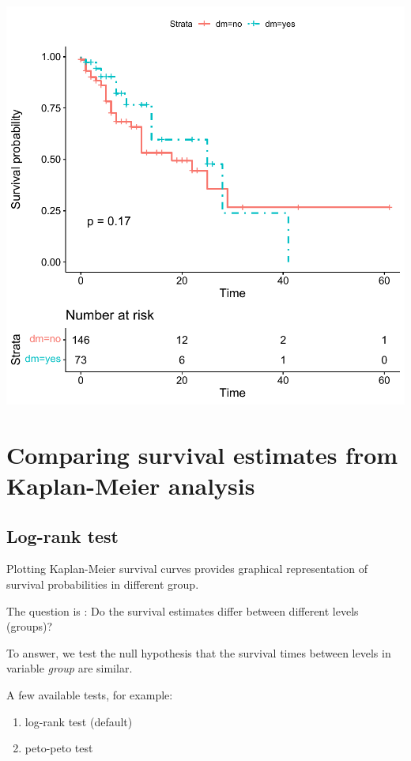 \documentclass[
]{book}
\providecommand{\tightlist}{%
  \setlength{\itemsep}{0pt}\setlength{\parskip}{0pt}}
\begin{document}
\begin{center}\includegraphics[width=0.7\linewidth,keepaspectratio]{Multivariable_Data_Analysis_files/figure-latex/unnamed-chunk-175-1} \end{center}

\hypertarget{comparing-survival-estimates-from-kaplan-meier-analysis}{%
\section{Comparing survival estimates from Kaplan-Meier analysis}\label{comparing-survival-estimates-from-kaplan-meier-analysis}}

\hypertarget{log-rank-test}{%
\subsection{Log-rank test}\label{log-rank-test}}

Plotting Kaplan-Meier survival curves provides graphical representation of survival probabilities in different group.

The question is : Do the survival estimates differ between different levels (groups)?

To answer, we test the null hypothesis that the survival times between levels in variable \emph{group} are similar.

A few available tests, for example:

\begin{enumerate}
\def\labelenumi{\arabic{enumi}.}
\tightlist
\item
  log-rank test (default)
\item
  peto-peto test
\end{enumerate}
\end{document}
